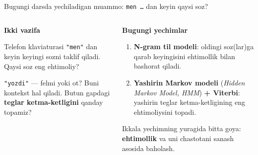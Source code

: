 \documentclass[aspectratio=169,11pt]{beamer}
\newcommand{\uzq}{\textquotesingle{}}
\begin{document}
\begin{frame}{Bugungi darsda yechiladigan muammo: \texttt{men \ldots} dan keyin qaysi so\uzq{}z?}
\small

\begin{columns}[T,totalwidth=\textwidth]
\begin{column}{0.50\textwidth}
\textbf{Ikki vazifa}

\begin{tcolorbox}[warnbox,title=1.~Avtomatik to\uzq{}ldirish]
Telefon klaviaturasi \texttt{"men"} dan keyin keyingi so\uzq{}zni taklif qiladi.
Qaysi so\uzq{}z eng ehtimoliy?
\end{tcolorbox}

\vspace{3pt}

\begin{tcolorbox}[warnbox,title=2.~So\uzq{}z turkumini aniqlash]
\texttt{"yozdi"} --- fe\uzq{}lmi yoki ot? Buni kontekst hal qiladi.
Butun gapdagi \textbf{teglar ketma-ketligini} qanday topamiz?
\end{tcolorbox}
\end{column}

\begin{column}{0.46\textwidth}
\textbf{Bugungi yechimlar}

\begin{enumerate}\setlength\itemsep{6pt}
  \item \textbf{N-gram til modeli}: oldingi so\uzq{}z(lar)ga qarab keyingisini
        ehtimollik bilan bashorat qiladi.
  \item \textbf{Yashirin Markov modeli}
        (\textit{Hidden Markov Model, HMM}) \textbf{+ Viterbi}: yashirin teglar
        ketma-ketligining eng ehtimoliysini topadi.
\end{enumerate}

\vspace{4pt}

\begin{tcolorbox}[okbox]
\footnotesize
Ikkala yechimning yuragida bitta g\uzq{}oya: \textbf{ehtimollik} va uni
chastotani sanash asosida baholash.
\end{tcolorbox}
\end{column}
\end{columns}

\end{frame}
\end{document}
